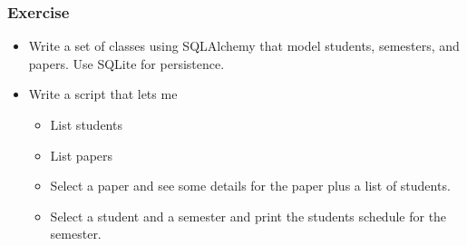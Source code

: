 \documentclass[10pt]{beamer}
\begin{document}
\begin{frame}
	\frametitle{Exercise}
	\begin{itemize}
		\item Write a set of classes using SQLAlchemy that
		model students, semesters, and papers.  Use SQLite for persistence.
		\item Write a script that lets me 
		\begin{itemize}
			\item List students
			\item List papers
			\item Select a paper and see some details for the paper plus a list of students.
			\item Select a student and a semester and print the students schedule for the semester.
		\end{itemize}
	\end{itemize}
\end{frame}
\end{document}
